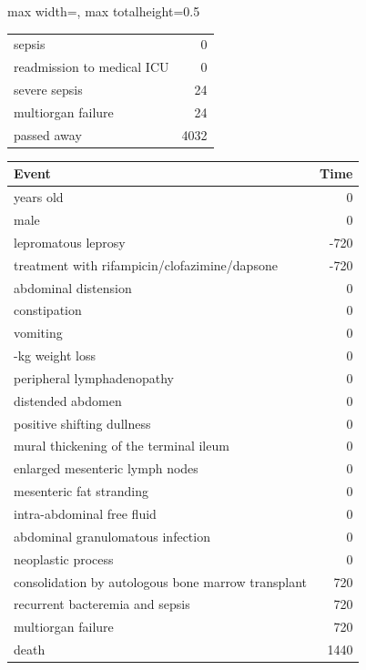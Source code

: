 \begin{ChSixUncaptionedFigure}
\begin{ChSixFloatBody}
\begin{adjustbox}{max width=\linewidth, max totalheight=0.5\textheight}
\begin{tcolorbox}
\begin{minipage}[t]{0.49\textwidth}
\begin{tcolorbox}[ChSix/annobox,title={DeepSeek-R1-IQ1 annotation}]
\begin{tabular}{>{\raggedright\arraybackslash}p{} r}
sepsis & 0 \\
readmission to medical ICU & 0 \\
severe sepsis & 24 \\
multiorgan failure & 24 \\
passed away & 4032 \\
\bottomrule
\end{tabular}
\end{tcolorbox}
\end{minipage}
\hfill
\begin{minipage}[t]{0.49\textwidth}\vspace{0pt}
\begin{tcolorbox}[ChSix/annobox,title={Llama-3.3-70B-Instruct annotation}]
\ChSixAnnotationTableStyle
\begin{tabular}{>{\raggedright\arraybackslash}p{} r}
\toprule
\textbf{Event} & \textbf{Time} \\
\midrule
57 years old & 0 \\
male & 0 \\
lepromatous leprosy & -720 \\
treatment with rifampicin/clofazimine/dapsone & -720 \\
abdominal distension & 0 \\
constipation & 0 \\
vomiting & 0 \\
10-kg weight loss & 0 \\
peripheral lymphadenopathy & 0 \\
distended abdomen & 0 \\
positive shifting dullness & 0 \\
mural thickening of the terminal ileum & 0 \\
enlarged mesenteric lymph nodes & 0 \\
mesenteric fat stranding & 0 \\
intra-abdominal free fluid & 0 \\
abdominal granulomatous infection & 0 \\
neoplastic process & 0 \\
consolidation by autologous bone marrow transplant & 720 \\
recurrent bacteremia and sepsis & 720 \\
multiorgan failure & 720 \\
death & 1440 \\
\bottomrule
\end{tabular}
\end{tcolorbox}
\end{minipage}

\end{tcolorbox}
\end{adjustbox}

\end{ChSixFloatBody}
\end{ChSixUncaptionedFigure}